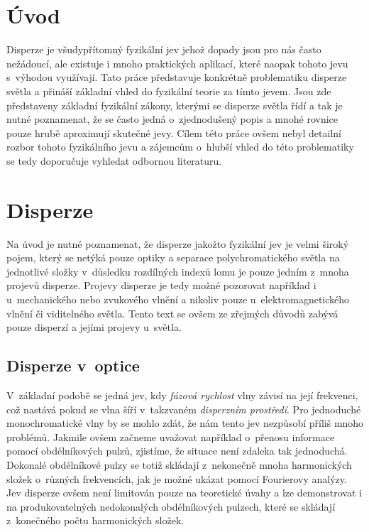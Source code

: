 

\section{Úvod}
Disperze je všudypřítomný fyzikální jev jehož
dopady jsou pro nás často nežádoucí, ale
existuje i mnoho praktických aplikací, které
naopak tohoto jevu s~výhodou využívají.
Tato práce představuje konkrétně problematiku
disperze světla a přináší základní vhled do
fyzikální teorie za tímto jevem. Jsou zde
představeny
základní fyzikální zákony, kterými se disperze
světla řídí a tak je nutné poznamenat, že se
často jedná o~zjednodušený popis a mnohé
rovnice pouze hrubě aproximují skutečné
jevy. Cílem této práce ovšem nebyl detailní
rozbor tohoto fyzikálního jevu a zájemcům
o~hlubší vhled do této problematiky se tedy
doporučuje vyhledat odbornou literaturu.

\section{Disperze}
Na úvod je nutné poznamenat, že disperze jakožto
fyzikální jev je velmi široký pojem, který se netýká
pouze optiky a separace polychromatického světla
na jednotlivé složky v~důsledku rozdílných indexů lomu
je pouze jedním z~mnoha projevů disperze. Projevy
disperze je tedy možné pozorovat například i
u~mechanického nebo zvukového vlnění a nikoliv pouze
u~elektromagnetického vlnění či viditelného
světla. Tento text se ovšem ze zřejmých důvodů
zabývá pouze disperzí a jejími projevy u~světla.

\subsection{Disperze v~optice}
V~základní podobě se jedná jev, kdy \textit{fázová
rychlost} vlny závisí na její frekvenci, což nastává
pokud se vlna šíří v~takzvaném 
\textit{disperzním prostředí}. Pro jednoduché
monochromatické vlny by se mohlo
zdát, že nám tento jev nezpůsobí příliš mnoho
problémů. Jakmile ovšem začneme uvažovat například
o~přenosu informace pomocí obdélníkových pulzů,
zjistíme, že situace není zdaleka tak jednoduchá.
Dokonalé obdélníkové pulzy se totiž skládají
z~nekonečně mnoha harmonických složek o~různých
frekvencích, jak je možné
ukázat pomocí Fourierovy analýzy. Jev disperze
ovšem není limitován pouze na teoretické úvahy
a lze demonstrovat i na produkovatelných
nedokonalých obdélníkových pulzech, které se
skládají z~konečného počtu harmonických složek.

